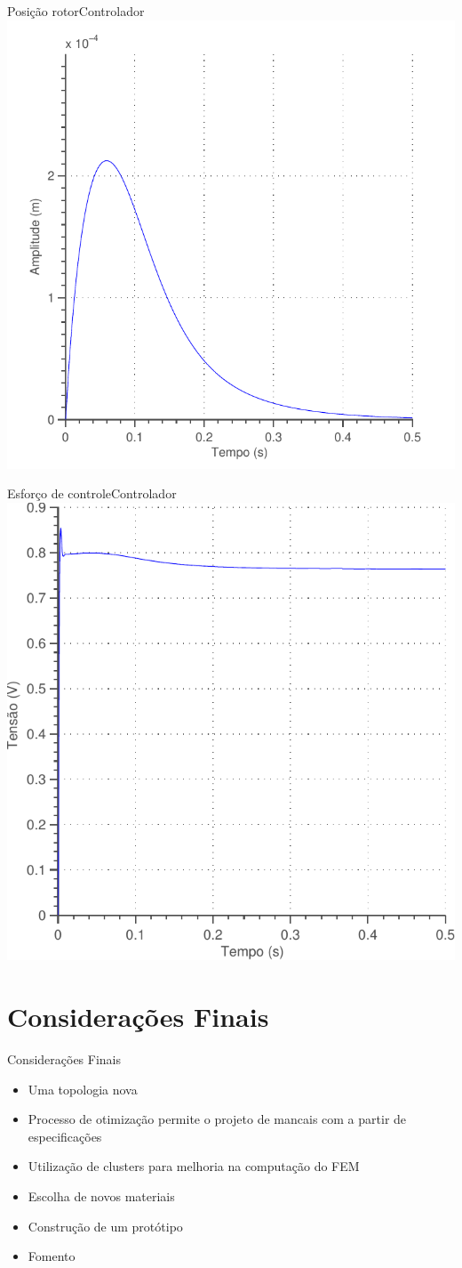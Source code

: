 \documentclass{beamer}
\begin{document}
\begin{frame}{Posição rotor}{Controlador}
\centering
\includegraphics[width=0.7\linewidth]{controle/pid_nlinear_condicao_inicial_posicao}
\end{frame}

\begin{frame}{Esforço de controle}{Controlador}
\centering
\includegraphics[width=0.7\linewidth]{controle/pid_nlinear_condicao_inicial_esforco}
\end{frame}

\section{Considerações Finais}

\begin{frame}{Considerações Finais}
	\begin{itemize}
	\item Uma topologia nova
	\item Processo de otimização permite o projeto de mancais com a partir de especificações
	\item Utilização de clusters para melhoria na computação do FEM
	\item Escolha de novos materiais
	\item Construção de um protótipo
	\item Fomento
	\end{itemize}
\end{frame}
\end{document}
